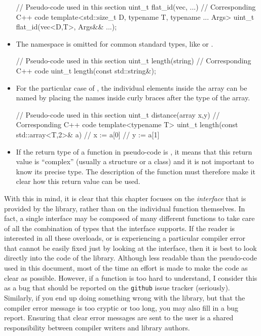 \documentclass[12pt]{report}
\newenvironment{example}
{
    \begin{mdframed}[style=example,frametitle={Example}]
}
{
    \end{mdframed}
}
\begin{document}
\begin{itemize}
\begin{example}
\begin{cppcode}
// Pseudo-code used in this section
uint_t flat_id(vec, ...)
// Corresponding C++ code
template<std::size_t D, typename T, typename ... Args>
uint_t flat_id(vec<D,T>, Args&& ...);
\end{cppcode}
\end{example}

\item The  namespace is omitted for common standard types, like  or .

\begin{example}
\begin{cppcode}
// Pseudo-code used in this section
uint_t length(string)
// Corresponding C++ code
uint_t length(const std::string&);
\end{cppcode}
\end{example}

\item For the particular case of , the individual elements inside the array can be named by placing the names inside curly braces after the type of the array.

\begin{example}
\begin{cppcode}
// Pseudo-code used in this section
uint_t distance(array {x,y})
// Corresponding C++ code
template<typename T>
uint_t length(const std::array<T,2>& a) {
    // x := a[0]
    // y := a[1]
}
\end{cppcode}
\end{example}

\item If the return type of a function in pseudo-code is , it means that this return value is ``complex'' (usually a structure or a class) and it is not important to know its precise type. The description of the function must therefore make it clear how this return value can be used.

\end{itemize}

With this in mind, it is clear that this chapter focuses on the \emph{interface} that is provided by the library, rather than on the individual function themselves. In fact, a single interface may be composed of many different functions to take care of all the combination of types that the interface supports. If the reader is interested in all these overloads, or is experiencing a particular compiler error that cannot be easily fixed just by looking at the interface, then it is best to look directly into the code of the library. Although less readable than the pseudo-code used in this document, most of the time an effort is made to make the code as clear as possible. However, if a function is too hard to understand, I consider this as a bug that should be reported on the \texttt{github} issue tracker (seriously). Similarly, if you end up doing something wrong with the library, but that the compiler error message is too cryptic or too long, you may also fill in a bug report. Ensuring that clear error messages are sent to the user is a shared responsibility between compiler writers and library authors.
\end{document}
